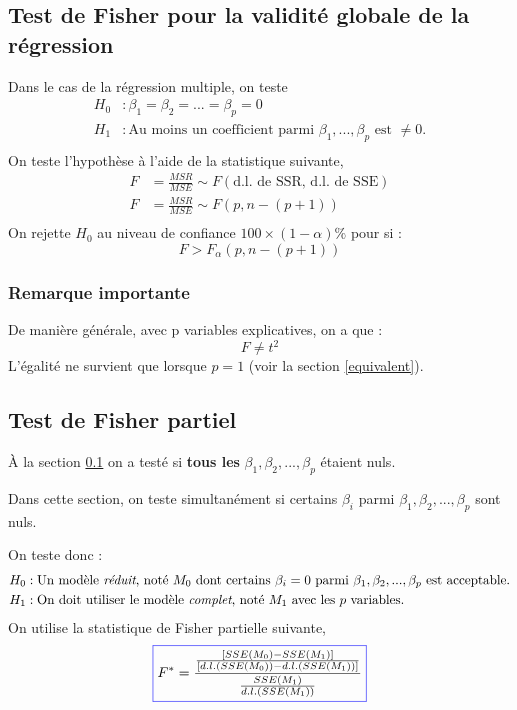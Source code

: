 \documentclass[11pt,french]{report}
\begin{document}
\subsection{Test de Fisher pour la validité globale de la régression}
\label{sec:fisherT}
Dans le cas de la régression multiple, on teste 
\begin{align*}
H_0 &: \beta_1 = \beta_2 = ... = \beta_p = 0 \\
H_1 &: \text{Au moins un coefficient parmi $\beta_1,...,\beta_p$ est $\neq 0$.} \\
\end{align*}
On teste l'hypothèse à l'aide de la statistique suivante, \\
\begin{align*}
F &= \frac{MSR}{MSE} \sim F(\text{d.l. de SSR, d.l. de SSE}) \\
F &= \frac{MSR}{MSE} \sim F(p, n - (p+1)) \\
\end{align*}
On rejette $H_0$ au niveau de confiance $100 \times (1 - \alpha)\%$ pour si :
$$
F > F_{\alpha}(p, n-(p+1))
$$

\subsubsection*{Remarque importante}
De manière générale, avec p variables explicatives, on a que :
$$
F \neq t^2
$$
L'égalité ne survient que lorsque $p=1$ (voir la section \ref{equivalent}).

\subsection{Test de Fisher partiel}
\label{sec:testFpartiel}
À la section \ref{sec:fisherT} on a testé si \textbf{tous les} $\beta_1, \beta_2,...,\beta_p$ étaient nuls. \newline

Dans cette section, on teste simultanément si certains $\beta_i$ parmi $\beta_1, \beta_2,...,\beta_p$ sont nuls.

On teste donc :
\begin{align*}
H_0 &: \text{Un modèle \emph{réduit}, noté $M_0$ dont certains $\beta_i =0$ parmi $\beta_1, \beta_2,...,\beta_p$ est acceptable.} \\
H_1 &: \text{On doit utiliser le modèle \emph{complet}, noté $M_1$ avec les $p$ variables.} \\
\end{align*}
On utilise la statistique de Fisher partielle suivante,
\begin{equation}
\label{eq:fisherpartiel}
\color{blue}
\boxed{\color{black}
F^* = \frac{\frac{[SSE(M_0) - SSE(M_1)]}{[d.l.(SSE(M_0)) - d.l.(SSE(M_1))]}}{\frac{SSE(M_1)}{d.l.(SSE(M_1))}}
}
\end{equation}
\end{document}
